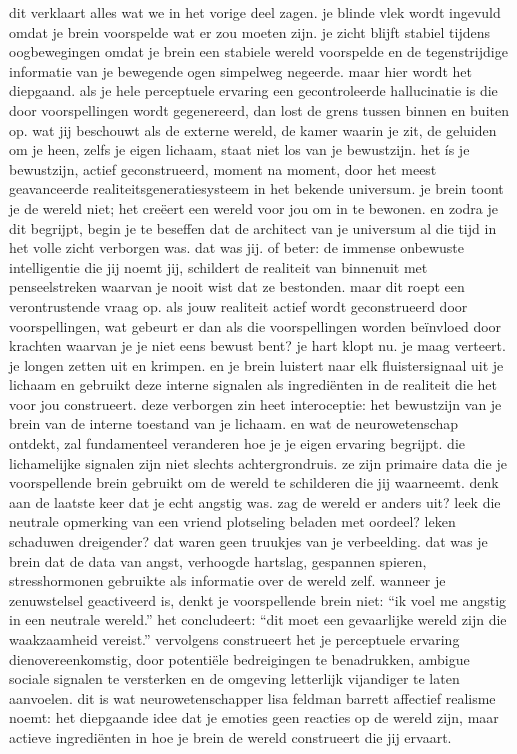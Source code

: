 dit verklaart alles wat we in het vorige deel zagen. je blinde vlek wordt ingevuld omdat je brein voorspelde wat er zou moeten zijn. je zicht blijft stabiel tijdens oogbewegingen omdat je brein een stabiele wereld voorspelde en de tegenstrijdige informatie van je bewegende ogen simpelweg negeerde. maar hier wordt het diepgaand. als je hele perceptuele ervaring een gecontroleerde hallucinatie is die door voorspellingen wordt gegenereerd, dan lost de grens tussen binnen en buiten op. wat jij beschouwt als de externe wereld, de kamer waarin je zit, de geluiden om je heen, zelfs je eigen lichaam, staat niet los van je bewustzijn. het ís je bewustzijn, actief geconstrueerd, moment na moment, door het meest geavanceerde realiteitsgeneratiesysteem in het bekende universum. je brein toont je de wereld niet; het creëert een wereld voor jou om in te bewonen. en zodra je dit begrijpt, begin je te beseffen dat de architect van je universum al die tijd in het volle zicht verborgen was. dat was jij. of beter: de immense onbewuste intelligentie die jij noemt jij, schildert de realiteit van binnenuit met penseelstreken waarvan je nooit wist dat ze bestonden.
maar dit roept een verontrustende vraag op. als jouw realiteit actief wordt geconstrueerd door voorspellingen, wat gebeurt er dan als die voorspellingen worden beïnvloed door krachten waarvan je je niet eens bewust bent? je hart klopt nu. je maag verteert. je longen zetten uit en krimpen. en je brein luistert naar elk fluistersignaal uit je lichaam en gebruikt deze interne signalen als ingrediënten in de realiteit die het voor jou construeert. deze verborgen zin heet interoceptie: het bewustzijn van je brein van de interne toestand van je lichaam. en wat de neurowetenschap ontdekt, zal fundamenteel veranderen hoe je je eigen ervaring begrijpt. die lichamelijke signalen zijn niet slechts achtergrondruis. ze zijn primaire data die je voorspellende brein gebruikt om de wereld te schilderen die jij waarneemt.
denk aan de laatste keer dat je echt angstig was. zag de wereld er anders uit? leek die neutrale opmerking van een vriend plotseling beladen met oordeel? leken schaduwen dreigender? dat waren geen truukjes van je verbeelding. dat was je brein dat de data van angst, verhoogde hartslag, gespannen spieren, stresshormonen gebruikte als informatie over de wereld zelf. wanneer je zenuwstelsel geactiveerd is, denkt je voorspellende brein niet: “ik voel me angstig in een neutrale wereld.” het concludeert: “dit moet een gevaarlijke wereld zijn die waakzaamheid vereist.” vervolgens construeert het je perceptuele ervaring dienovereenkomstig, door potentiële bedreigingen te benadrukken, ambigue sociale signalen te versterken en de omgeving letterlijk vijandiger te laten aanvoelen. dit is wat neurowetenschapper lisa feldman barrett affectief realisme noemt: het diepgaande idee dat je emoties geen reacties op de wereld zijn, maar actieve ingrediënten in hoe je brein de wereld construeert die jij ervaart.
